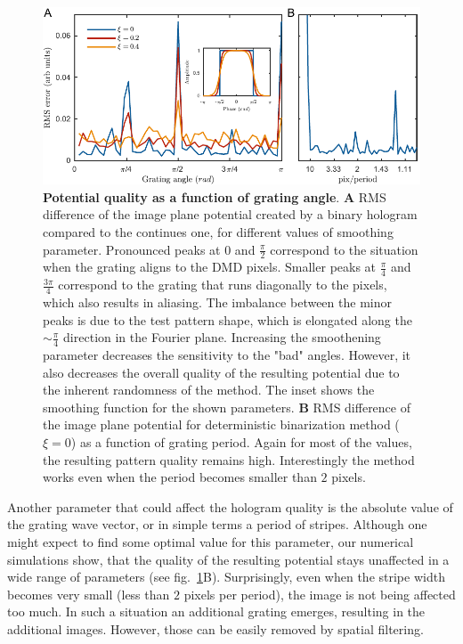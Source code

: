 \begin{figure}[t]
	\centering
	\includegraphics[scale=1]{figures/DMD_K_rotation_v3.pdf}
	\caption{{\bf Potential quality as a function of grating angle}. {\bf A} RMS difference of the image plane potential created by a binary hologram compared to the continues one, for different values of smoothing parameter. Pronounced peaks at $0$ and $\frac{\pi}{2}$ correspond to the situation when the grating aligns to the DMD pixels. Smaller peaks at $\frac{\pi}{4}$ and $\frac{3\pi}{4}$ correspond to the grating that runs diagonally to the pixels, which also results in aliasing. The imbalance between the minor peaks is due to the test pattern shape, which is elongated along the $\sim \frac{\pi}{4}$ direction in the Fourier plane. Increasing the smoothening parameter decreases the sensitivity to the "bad" angles. However, it also decreases the overall quality of the resulting potential due to the inherent randomness of the method. The inset shows the smoothing function for the shown parameters. {\bf B} RMS difference of the image plane potential for deterministic binarization method ($\xi = 0$) as a function of grating period. Again for most of the values, the resulting pattern quality remains high. Interestingly the method works even when the period becomes smaller than $2$ pixels.}
	\label{fig:DMD_K_rotation}
\end{figure}

Another parameter that could affect the hologram quality is the absolute value of the grating wave vector, or in simple terms a period of stripes. Although one might expect to find some optimal value for this parameter, our numerical simulations show, that the quality of the resulting potential stays unaffected in a wide range of parameters (see fig.~\ref{fig:DMD_K_rotation}B). Surprisingly, even when the stripe width becomes very small (less than $2$ pixels per period),  the image is not being affected too much. In such a situation an additional grating emerges, resulting in the additional images. However, those can be easily removed by spatial filtering.

